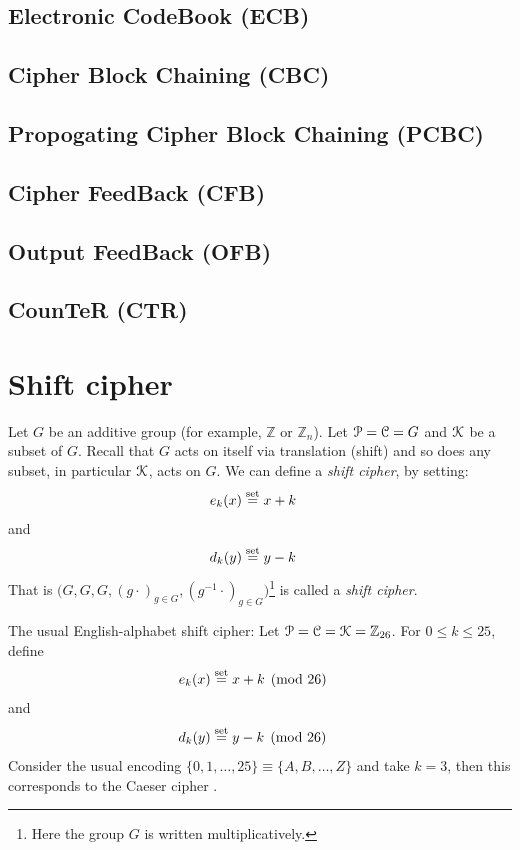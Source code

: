 \documentclass[a4paper, 12pt]{book} %
\begin{document}
\section{Electronic CodeBook (ECB)}

\section{Cipher Block Chaining (CBC)}

\section{Propogating Cipher Block Chaining (PCBC)}

\section{Cipher FeedBack (CFB)}

\section{Output FeedBack (OFB)}

\section{CounTeR (CTR)}

\chapter{Shift cipher}
\begin{definition}
    Let $G$ be an additive group (for example, $\mathbb{Z}$ or $\mathbb{Z}_n$). Let $\EuScript{P} = \EuScript{C} = G$ and $\EuScript{K}$ be a subset of $G$. Recall that $G$ acts on itself via translation (shift) and so does any subset, in particular $\EuScript{K}$, acts on $G$. We can define a \emph{shift cipher}, by setting:
    \begin{align}
        e_k(x) &\overset{\text{set}}{=} x + k 
    \end{align}
    and
    \begin{align}
        d_k(y) &\overset{\text{set}}{=} y - k 
    \end{align}
    That is $\bigg(G, G, G, (g \cdot)_{g \in G}, (g^{-1} \cdot)_{g \in G} \bigg)$\footnote{Here the group $G$ is written multiplicatively.} is called a \emph{shift cipher}.
\end{definition}


\begin{example}
    The usual English-alphabet shift cipher: Let $\EuScript{P} = \EuScript{C} = \EuScript{K} = \mathbb{Z}_{26}$. For $0 \leq k \leq 25$, define 
    \begin{align}
        e_k(x) &\overset{\text{set}}{=} x + k \pmod{26}
    \end{align}
    and 
    \begin{align}
        d_k(y) &\overset{\text{set}}{=} y - k \pmod{26} 
    \end{align}
    Consider the usual encoding $\{0,1,\ldots,25\} \equiv \{A, B, \ldots, Z\}$ and take $k = 3$, then this corresponds to the \textsf{Caeser} cipher .
\end{example}
\end{document}
